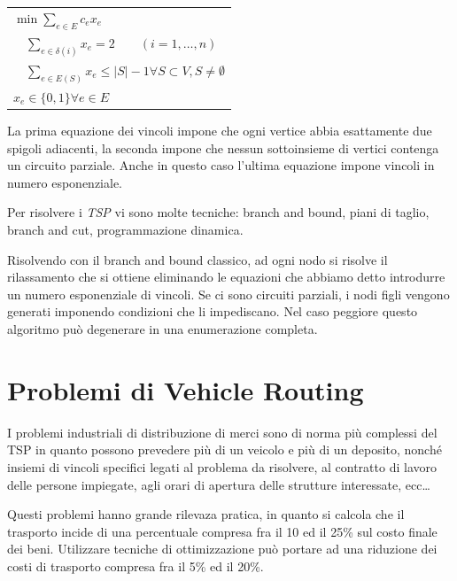 \documentclass[11pt]{book}
\begin{document}
\begin{itemize}
  \vspace{11pt}
  \begin{center}
  \begin{tabular}{l}
    $\min \sum\limits_{e\in E} c_ex_e$\\
    $\quad\sum\limits_{e \in \delta(i)} x_e = 2 \qquad (i=1,\dots,n)$\\
    $\quad\sum\limits_{e \in E(S)} x_e \leq |S|-1 \forall S \subset V,
    S \neq \emptyset$\\
    $x_e \in \{0,1\} \forall e \in E$\\
  \end{tabular}
  \end{center}
  \vspace{11pt}

  La prima equazione dei vincoli impone che ogni vertice abbia
  esattamente due spigoli adiacenti, la seconda impone che nessun
  sottoinsieme di vertici contenga un circuito parziale. Anche in
  questo caso l'ultima equazione impone vincoli in numero
  esponenziale.

\end{itemize}

Per risolvere i {\em TSP} vi sono molte tecniche: branch and bound,
piani di taglio, branch and cut, programmazione dinamica. 

Risolvendo con il branch and bound classico, ad ogni nodo si risolve
il rilassamento che si ottiene eliminando le equazioni che abbiamo
detto introdurre un numero esponenziale di vincoli. Se ci sono
circuiti parziali, i nodi figli vengono generati imponendo condizioni
che li impediscano. Nel caso peggiore questo algoritmo pu\`o
degenerare in una enumerazione completa. 

\section{Problemi di Vehicle Routing}

I problemi industriali di distribuzione di merci sono di norma pi\`u
complessi del TSP in quanto possono prevedere pi\`u di un veicolo e
pi\`u di un deposito, nonch\'e insiemi di vincoli specifici legati al
problema da risolvere, al contratto di lavoro delle persone impiegate,
agli orari di apertura delle strutture interessate, ecc\dots

Questi problemi hanno grande rilevaza pratica, in quanto si calcola
che il trasporto incide di una percentuale compresa fra il 10 ed il
25\% sul costo finale dei beni. Utilizzare tecniche di ottimizzazione
pu\`o portare ad una riduzione dei costi di trasporto compresa fra il
5\% ed il 20\%.
\end{document}
